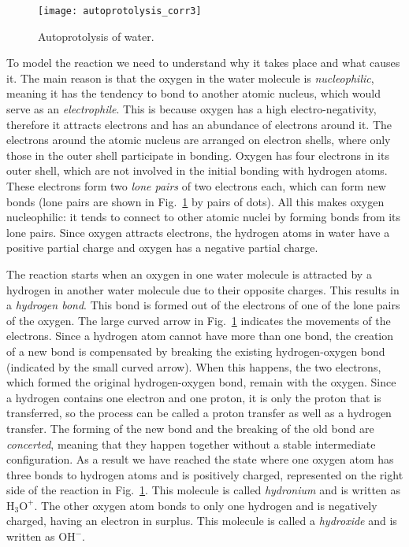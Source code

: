 \documentclass[runningheads]{llncs}
\begin{document}
\begin{figure}
\vspace{-2ex}\centering
\texttt{[image: autoprotolysis\_corr3]}
\vspace{-2ex}\caption{Autoprotolysis of water.}
\label{fig:autoprotolysis}
\vspace{-2ex}\end{figure}

To model the reaction we need to understand why it takes place and what causes it.
The main reason is that the oxygen in the water molecule is \emph{nucleophilic}, meaning it has the tendency to bond to another atomic nucleus, which would serve as an \emph{electrophile}. This is because oxygen has a high 
electro-negativity, therefore it attracts electrons and has an abundance of electrons around it. The electrons around the atomic nucleus are arranged on electron shells, where only those in the outer shell participate in bonding. Oxygen has four electrons in its outer shell, which are not involved in the initial bonding with hydrogen atoms. These electrons form two \emph{lone pairs} of two electrons each, which can form new bonds (lone pairs are shown in Fig.~\ref{fig:autoprotolysis} by pairs of dots). All this makes oxygen nucleophilic: it tends to connect 
to other atomic nuclei by forming bonds from its lone pairs. Since oxygen attracts electrons, the hydrogen atoms in water
have a positive partial charge and oxygen has a negative partial 
charge. 

The reaction starts when an oxygen in one water molecule is attracted by a hydrogen in another 
water molecule due to their opposite charges. This results in a \emph{hydrogen bond}. 
This bond is formed out of 
the electrons of one of the lone pairs of the oxygen. The large curved arrow in Fig.~\ref{fig:autoprotolysis} indicates the movements of the electrons. Since a hydrogen atom cannot have more 
than one bond, 
the creation of a new bond is compensated by breaking the existing hydrogen-oxygen bond (indicated by the small curved arrow). When this happens, the two electrons, which formed the original hydrogen-oxygen bond, remain with the oxygen. Since a hydrogen contains %
one electron and one proton, it is only the proton that is transferred, so the process can be called a proton transfer as well as a hydrogen transfer. The forming of the new bond and the breaking of the old bond are \emph{concerted}, meaning that %
they happen together without a stable 
intermediate configuration. As a result we have reached the state where one oxygen atom
has three bonds to hydrogen atoms and is positively charged, represented on the right side of the reaction in %
 Fig.~\ref{fig:autoprotolysis}. This molecule is called \emph{hydronium} and is written as $\mathrm{H_3O^+}$. The other oxygen atom bonds to only one hydrogen and is negatively charged, having an 
electron in surplus. This molecule is called a \emph{hydroxide} and is written as $\mathrm{OH^-}$. 
\end{document}
